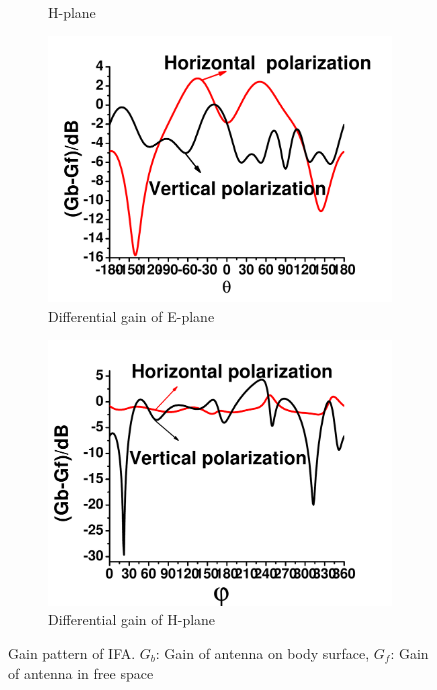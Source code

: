 \documentclass[journal]{IEEEtran}
\begin{document}
$$\begin{figure}[!htb]
\begin{subfigure}[b]{0.24\textwidth}
\caption{H-plane}
\label{fig:7c}	
\end{subfigure}		
\begin{subfigure}[b]{0.23\textwidth}
\includegraphics[width=\textwidth]{figs/7c.pdf}
\caption{Differential gain of E-plane }
\label{fig:7b}
\end{subfigure}
\begin{subfigure}[b]{0.23\textwidth}
\includegraphics[width=\textwidth]{figs/7d.pdf}
\caption{Differential gain of H-plane}
\label{fig:7d}	
\end{subfigure}
\caption{Gain pattern of IFA. $G_{b}$: Gain of antenna on body surface, $G_{f}$: Gain of antenna in free space }
\label{fig:7}
\end{figure}
\end{document}
